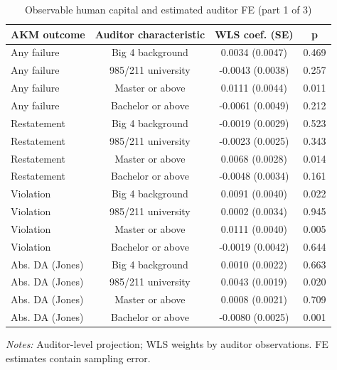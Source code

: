 \begin{table}[htbp]
\footnotesize
\centering
\caption{Observable human capital and estimated auditor FE (part 1 of 3)}
\begin{threeparttable}
\begin{tabular}{p{}ccc}
\toprule
AKM outcome & Auditor characteristic & WLS coef. (SE) & p \\
\midrule
Any failure & Big 4 background & 0.0034 (0.0047) & 0.469 \\
Any failure & 985/211 university & -0.0043 (0.0038) & 0.257 \\
Any failure & Master or above & 0.0111 (0.0044) & 0.011 \\
Any failure & Bachelor or above & -0.0061 (0.0049) & 0.212 \\
Restatement & Big 4 background & -0.0019 (0.0029) & 0.523 \\
Restatement & 985/211 university & -0.0023 (0.0025) & 0.343 \\
Restatement & Master or above & 0.0068 (0.0028) & 0.014 \\
Restatement & Bachelor or above & -0.0048 (0.0034) & 0.161 \\
Violation & Big 4 background & 0.0091 (0.0040) & 0.022 \\
Violation & 985/211 university & 0.0002 (0.0034) & 0.945 \\
Violation & Master or above & 0.0111 (0.0040) & 0.005 \\
Violation & Bachelor or above & -0.0019 (0.0042) & 0.644 \\
Abs. DA (Jones) & Big 4 background & 0.0010 (0.0022) & 0.663 \\
Abs. DA (Jones) & 985/211 university & 0.0043 (0.0019) & 0.020 \\
Abs. DA (Jones) & Master or above & 0.0008 (0.0021) & 0.709 \\
Abs. DA (Jones) & Bachelor or above & -0.0080 (0.0025) & 0.001 \\
\bottomrule
\end{tabular}
\begin{tablenotes}\footnotesize
\item \raggedright \textit{Notes:} Auditor-level projection; WLS weights by auditor observations. FE estimates contain sampling error.
\end{tablenotes}
\end{threeparttable}
\end{table}

